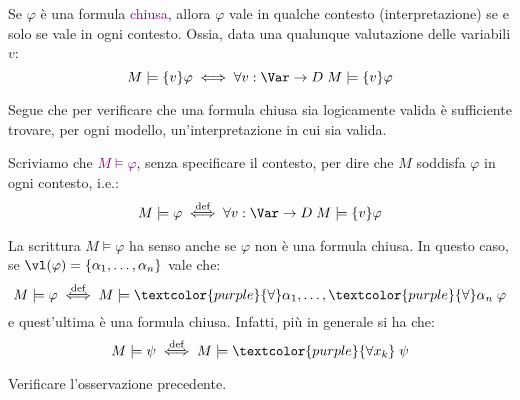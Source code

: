 \begin{corollary}
    Se $\varphi$ è una formula \textcolor{purple}{chiusa}, allora $\varphi$ vale in qualche contesto (interpretazione) se e solo se vale in ogni contesto. Ossia, data una qualunque valutazione delle variabili $v$:
    \[ M \models \{v\} \varphi \iff \forall v : \Var \to D \; M \models\{v\}\varphi
    \]
\end{corollary}

Segue che per verificare che una formula chiusa sia logicamente valida è sufficiente trovare, per ogni modello, un'interpretazione in cui sia valida.

\begin{notation}
    Scriviamo che \textcolor{purple}{$M \models \varphi$}, senza specificare il contesto, per dire che $M$ soddisfa $\varphi$ in ogni contesto, i.e.:
    \[ M \models \varphi \overset{\text{def}}{\iff} \forall v : \Var \to D \; M \models \{v\} \varphi
    \]
\end{notation}

\begin{remark}
    La scrittura $M \models \varphi$ ha senso anche se $\varphi$ non è una formula chiusa. In questo caso, se $\vl(\varphi) = \{\alpha_1,\ldots,\alpha_n\}$ vale che:
    \[ M \models \varphi \overset{\text{def}}{\iff} M \models \textcolor{purple}{\forall}\alpha_1, \ldots, \textcolor{purple}{\forall} \alpha_n \; \varphi
    \]
    e quest'ultima è una formula chiusa. Infatti, più in generale si ha che:
    \[ M \models \psi \overset{\text{def}}{\iff} M \models \textcolor{purple}{\forall x_k} \; \psi
    \]
\end{remark}

\begin{exercise}
    Verificare l'osservazione precedente.
\end{exercise}

